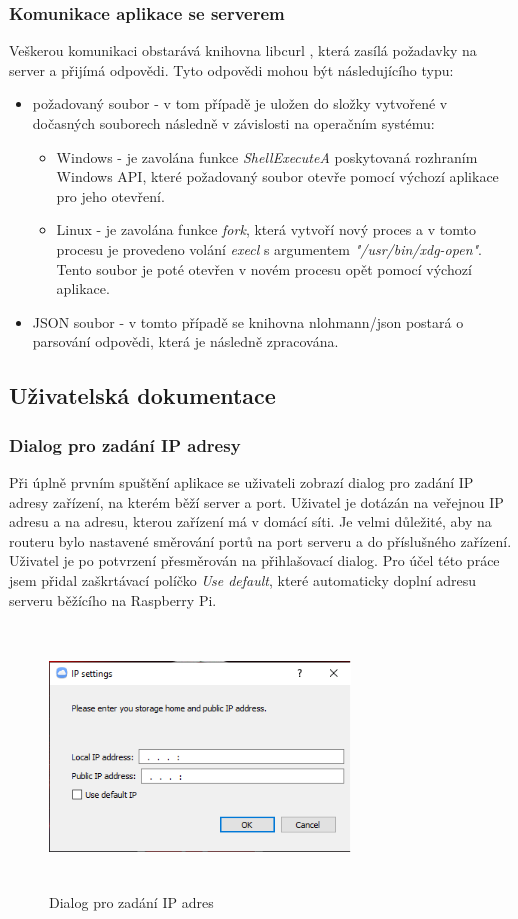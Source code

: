 \documentclass[
  glossaries,
]{kidiplom}
\begin{document}
\subsubsection{Komunikace aplikace se serverem}
Veškerou komunikaci obstarává knihovna libcurl \cite{LIBCURL}, která zasílá požadavky na server a přijímá odpovědi. Tyto odpovědi mohou být následujícího typu:
\begin{itemize}
	\item požadovaný soubor - v tom případě je uložen do složky vytvořené v dočasných souborech následně v závislosti na operačním systému:
	\begin{itemize}
	\item Windows - je zavolána funkce \textit {ShellExecuteA} poskytovaná rozhraním Windows API, které požadovaný soubor otevře pomocí výchozí aplikace pro jeho otevření.
	\item Linux - je zavolána funkce \textit{fork}, která vytvoří nový proces a v tomto procesu je provedeno volání \textit{execl} s argumentem \textit{"/usr/bin/xdg-open"}. Tento soubor je poté otevřen v novém procesu opět pomocí výchozí aplikace.
	\end{itemize}
	\item JSON soubor - v tomto případě se knihovna \mbox{nlohmann/json} \cite{JSONCPP} postará o parsování odpovědi, která je následně zpracována.
\end{itemize}
\subsection{Uživatelská dokumentace}
\subsubsection{Dialog pro zadání IP adresy}
Při úplně prvním spuštění aplikace se uživateli zobrazí dialog pro zadání IP adresy zařízení, na kterém běží server a port. Uživatel je dotázán na veřejnou IP adresu a na adresu, kterou zařízení má v domácí síti. Je velmi důležité, aby na routeru bylo nastavené směrování portů na port serveru a do příslušného zařízení. Uživatel je po potvrzení přesměrován na přihlašovací dialog. Pro účel této práce jsem přidal zaškrtávací políčko \textit{Use default}, které automaticky doplní adresu serveru běžícího na Raspberry Pi.
\begin{figure}[H]
    \centering
    \includegraphics[width=8cm,height=7cm,keepaspectratio]{ip}
    \caption{Dialog pro zadání IP adres}
    \label{fig:ip}
\end{figure}
\end{document}
